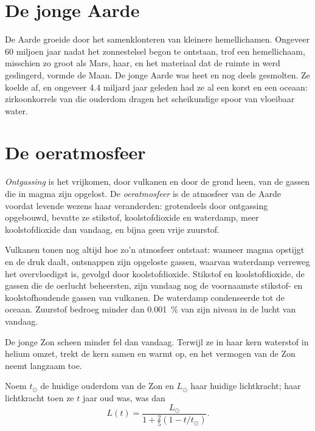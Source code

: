 \section{De jonge Aarde}

De Aarde groeide door het samenklonteren van kleinere hemellichamen. Ongeveer 60 miljoen jaar
nadat het zonnestelsel begon te ontstaan, trof een hemellichaam, misschien zo groot als Mars,
haar, en het materiaal dat de ruimte in werd geslingerd, vormde de Maan. De jonge Aarde was
heet en nog deels gesmolten. Ze koelde af, en ongeveer 4.4 miljard jaar geleden
had ze al een korst en een oceaan: zirkoonkorrels van die ouderdom dragen het scheikundige spoor
van vloeibaar water.

\section{De oeratmosfeer}

\begin{definition}\label{def:g12:early-earth:primitive-atmosphere}
\emph{Ontgassing} is het vrijkomen, door vulkanen en door
de grond heen, van de gassen die in magma zijn opgelost. De \emph{oeratmosfeer} is de atmosfeer van de Aarde voordat
levende wezens haar veranderden: grotendeels door ontgassing opgebouwd, bevatte ze stikstof,
koolstofdioxide en waterdamp, meer koolstofdioxide dan vandaag, en bijna
geen vrije zuurstof.
\end{definition}

Vulkanen tonen nog altijd hoe zo'n atmosfeer ontstaat: wanneer magma opstijgt en de
druk daalt, ontsnappen zijn opgeloste gassen, waarvan waterdamp verreweg het overvloedigst is,
gevolgd door koolstofdioxide. Stikstof en koolstofdioxide, de gassen
die de oerlucht beheersten, zijn vandaag nog de voornaamste stikstof- en
koolstofhoudende gassen van vulkanen. De waterdamp condenseerde tot de
oceaan. Zuurstof bedroeg minder dan \qty{0.001}{\percent} van zijn niveau in de lucht van
vandaag.

De jonge Zon scheen minder fel dan vandaag. Terwijl ze in haar kern waterstof in
helium omzet, trekt de kern samen en warmt op, en het vermogen van de Zon
neemt langzaam toe.

\begin{proposition}\label{prop:g12:early-earth:luminosity}
Noem $t_\odot$ de huidige ouderdom van de Zon en $L_\odot$ haar huidige
lichtkracht; haar lichtkracht toen ze $t$ jaar oud was, was dan
\[
  L(t) = \frac{L_\odot}{1 + \frac{2}{5}\left(1 - t/t_\odot\right)} .
\]
\end{proposition}

